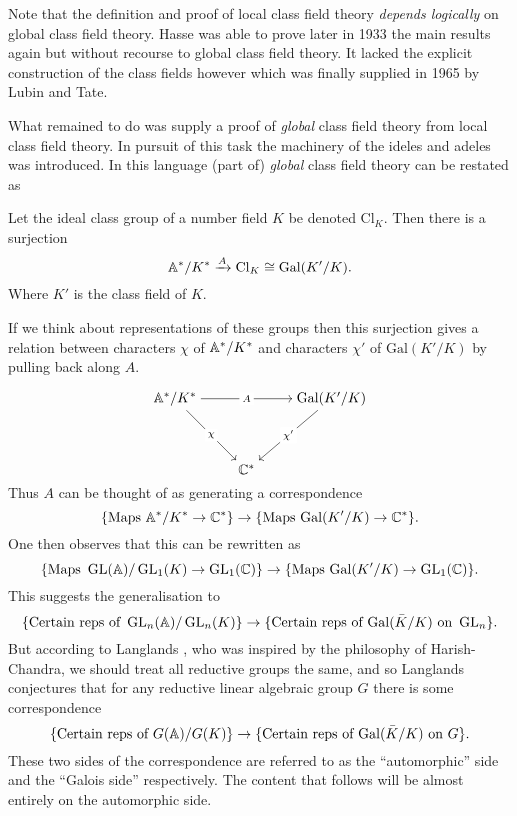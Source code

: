 Note that the definition and proof of local class field theory \textit{depends logically } on global class field theory. Hasse was able to prove later in 1933 the main results again but without recourse to global class field theory. It lacked the explicit construction of the class fields however which was finally supplied in 1965 by Lubin and Tate.

What remained to do was supply a proof of \textit{global} class field theory from local class field theory. In pursuit of this task the machinery of the ideles and adeles was introduced. In this language (part of) \textit{global} class field theory can be restated as 
\begin{Theorem}
	Let the ideal class group of a number field \(K\) be denoted \(\mathrm{Cl}_K\). Then there is a surjection
	\[ \A^*/ K^* \xrightarrow{A} \mathrm{Cl}_K \cong \mathrm{Gal}(K'/K).\]
	Where \(K'\) is the class field of \(K\).
\end{Theorem}
If we think about representations of these groups then this surjection gives a relation between characters \(\chi\) of \(\A^*/K^*\) and characters \(\chi'\) of \(\mathrm{Gal}(K'/K)\) by pulling back along \(A\).

\[\begin{tikzcd}[cramped]
	{\A^*/K^*} && {\mathrm{Gal}(K'/K)} \\
	\\
	& {\C^*}
	\arrow["A"{description}, from=1-1, to=1-3]
	\arrow["\chi"{description}, from=1-1, to=3-2]
	\arrow["{\chi'}"{description}, from=1-3, to=3-2]
\end{tikzcd}\]
Thus \(A\) can be thought of as generating a correspondence
\[\{\text{Maps }\A^*/K^*\to \C^*\} \to\{ \text{Maps }\mathrm{Gal}(K'/K)\to \C^*\}. \]
One then observes that this can be rewritten as 
\[\{\text{Maps }\GL(\A)/\GL_1(K)\to \GL_1(\C)\} \to\{ \text{Maps }\mathrm{Gal}(K'/K)\to \GL_1(\C)\} .\]
This suggests the generalisation to 
\[\{\text{Certain reps of }\GL_n(\A)/\GL_n(K)\} \to\{ \text{Certain reps of  }\mathrm{Gal}(\bar{K}/K)\text{ on } \GL_n\}   .\]
But according to Langlands \cite{langlandsREPRESENTATIONTHEORYITS}, who was inspired by the philosophy of Harish-Chandra, we should treat all reductive groups the same, and so Langlands conjectures that for any reductive linear algebraic group \(G\) there is some correspondence
\[\{\text{Certain reps of }G(\A)/G(K)\} \to\{ \text{Certain reps of  }\mathrm{Gal}(\bar{K}/K)\text{ on } G\} .\]
These two sides of the correspondence are referred to as the ``automorphic'' side and the ``Galois side'' respectively. The content that follows will be almost entirely on the automorphic side. 


